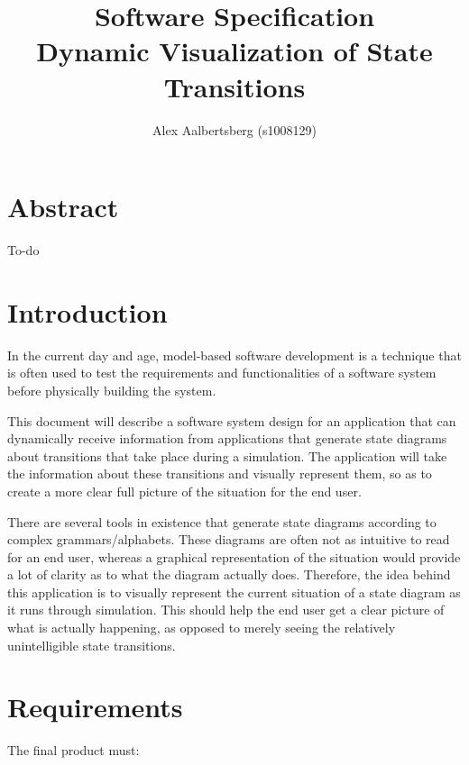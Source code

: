 \documentclass[11pt,a4paper,twocolumn]{article}
\begin{document}
\title{Software Specification \\ \vspace{2mm} {\large Dynamic Visualization of State Transitions}}
\author{Alex Aalbertsberg (s1008129)}
\maketitle

\clearpage
\tableofcontents

\clearpage
\section{Abstract}
To-do

\section{Introduction}

In the current day and age, model-based software development is a technique that is often used to test the requirements and functionalities of a software system before physically building the system. 

This document will describe a software system design for an application that can dynamically receive information from applications that generate state diagrams about transitions that take place during a simulation. The application will take the information about these transitions and visually represent them, so as to create a more clear full picture of the situation for the end user.

There are several tools in existence that generate state diagrams according to complex grammars/alphabets. These diagrams are often not as intuitive to read for an end user, whereas a graphical representation of the situation would provide a lot of clarity as to what the diagram actually does. Therefore, the idea behind this application is to visually represent the current situation of a state diagram as it runs through simulation. This should help the end user get a clear picture of what is actually happening, as opposed to merely seeing the relatively unintelligible state transitions.

\section{Requirements}

The final product must:
\end{document}
